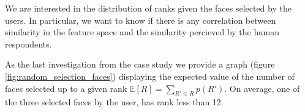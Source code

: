 
We are interested in the distribution of ranks given the faces selected by the users. In particular, we want to know if there is any correlation between similarity in the feature space and the similarity percieved by the human respondents. 



As the last investigation from the case study we provide a graph (figure \ref{fig:random_selection_faces}) displaying the expected value of the number of faces selected up to a given rank $\mathbb{E}[R] = \sum_{R' \leq R}p(R')$. On average, one of the three selected faces by the user, has rank less than 12.

